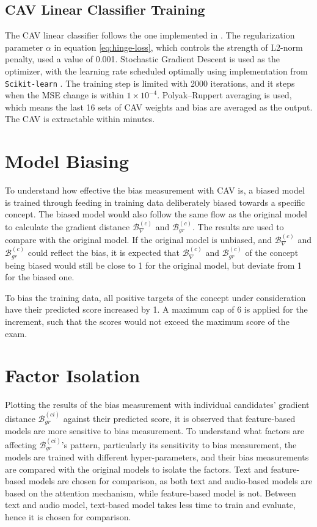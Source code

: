 \subsection{CAV Linear Classifier Training}
The CAV linear classifier follows the one implemented in \cite{feature_bias}. The regularization parameter $\alpha$ in equation \ref{eq:hinge-loss}, which controls the strength of L2-norm penalty, used a value of 0.001. Stochastic Gradient Descent is used as the optimizer, with the learning rate scheduled optimally using implementation from \verb|Scikit-learn| \cite{scikit-learn}. The training step is limited with 2000 iterations, and it steps when the MSE change is within $1 \times 10^{-4}$. Polyak–Ruppert averaging is used, which means the last 16 sets of CAV weights and bias are averaged as the output. The CAV is extractable within minutes.

\section{Model Biasing}
To understand how effective the bias measurement with CAV is, a biased model is trained through feeding in training data deliberately biased towards a specific concept. The biased model would also follow the same flow as the original model to calculate the gradient distance $\mathcal{B}^{(c)}_{\nabla}$ and $\mathcal{B}^{(c)}_{gr}$. The results are used to compare with the original model. If the original model is unbiased, and $\mathcal{B}^{(c)}_{\nabla}$ and $\mathcal{B}^{(c)}_{gr}$ could reflect the bias, it is expected that $\mathcal{B}^{(c)}_{\nabla}$ and $\mathcal{B}^{(c)}_{gr}$ of the concept being biased would still be close to 1 for the original model, but deviate from 1 for the biased one.

To bias the training data, all positive targets of the concept under consideration have their predicted score increased by 1. A maximum cap of 6 is applied for the increment, such that the scores would not exceed the maximum score of the exam.

\section{Factor Isolation}
Plotting the results of the bias measurement with individual candidates' gradient distance $\mathcal{B}^{(ci)}_{gr}$ against their predicted score, it is observed that feature-based models are more sensitive to bias measurement. To understand what factors are affecting $\mathcal{B}^{(ci)}_{gr}$'s pattern, particularly its sensitivity to bias measurement, the models are trained with different hyper-parameters, and their bias measurements are compared with the original models to isolate the factors. Text and feature-based models are chosen for comparison, as both text and audio-based models are based on the attention mechanism, while feature-based model is not. Between text and audio model, text-based model takes less time to train and evaluate, hence it is chosen for comparison.

